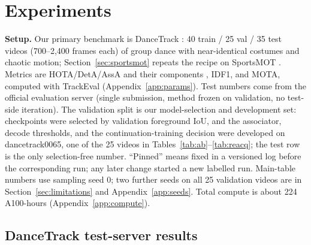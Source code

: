 \documentclass{article} %
\newcommand{\rev}[1]{#1}
\begin{document}
\section{Experiments}
\label{sec:experiments}

\textbf{Setup.} Our primary benchmark is DanceTrack \citep{sun2022dancetrack}: 40 train /
25 val / 35 test videos (700--2,400 frames each) of group dance with near-identical costumes
and chaotic motion; Section~\ref{sec:sportsmot} repeats the recipe on SportsMOT
\citep{cui2023sportsmot}. Metrics are HOTA/DetA/AssA and their components \citep{luiten2021hota},
IDF1, and MOTA, computed with TrackEval (Appendix~\ref{app:params}). Test numbers come
from the official evaluation server (single submission, method frozen on validation, no
test-side iteration). The validation split is our model-selection and development set:
checkpoints were selected by validation foreground IoU, and the associator, decode
thresholds, and the continuation-training decision were developed on dancetrack0065, one of
the 25 videos in Tables~\ref{tab:ab}--\ref{tab:reacq}; the test row is the only
selection-free number. ``Pinned'' means fixed in a versioned log before the
corresponding run; any later change started a new labelled run. \rev{Main-table numbers
use sampling seed 0; two further seeds on all 25 validation videos are in
Section~\ref{sec:limitations} and Appendix~\ref{app:seeds}.} Total compute is about
\rev{224} A100-hours (Appendix~\ref{app:compute}).

\subsection{DanceTrack test-server results}
\label{sec:main}
\end{document}
